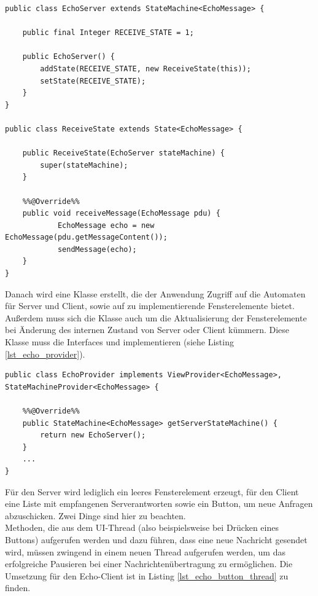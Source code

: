 \begin{lstlisting}[style=java, caption={Implementierung des Serverautomaten}, label=lst_echo_server_state_machine]
public class EchoServer extends StateMachine<EchoMessage> {

	public final Integer RECEIVE_STATE = 1; 
	
	public EchoServer() {
		addState(RECEIVE_STATE, new ReceiveState(this));               
		setState(RECEIVE_STATE);
	}
}

public class ReceiveState extends State<EchoMessage> {

	public ReceiveState(EchoServer stateMachine) {
		super(stateMachine);
	}

	%%@Override%%
	public void receiveMessage(EchoMessage pdu) {
			EchoMessage echo = new EchoMessage(pdu.getMessageContent());
			sendMessage(echo);
	}
}
\end{lstlisting}

Danach wird eine Klasse  erstellt, die der Anwendung Zugriff auf die Automaten für Server und Client, sowie auf zu implementierende Fensterelemente bietet. Außerdem muss sich die Klasse auch um die Aktualisierung der Fensterelemente bei Änderung des internen Zustand von Server oder Client kümmern. Diese Klasse muss die Interfaces  und  implementieren (siehe Listing \ref{lst_echo_provider}).

\begin{lstlisting}[style=java, caption={Implementierung der \sourceobject{EchoProvider}-Klasse}, label=lst_echo_provider]
public class EchoProvider implements ViewProvider<EchoMessage>, StateMachineProvider<EchoMessage> {

	%%@Override%%
	public StateMachine<EchoMessage> getServerStateMachine() {
		return new EchoServer();
	}
	...
}
\end{lstlisting}

Für den Server wird lediglich ein leeres Fensterelement erzeugt, für den Client eine Liste mit empfangenen Serverantworten sowie ein Button, um neue Anfragen abzuschicken. Zwei Dinge sind hier zu beachten.\\
Methoden, die aus dem UI-Thread (also beispielsweise bei Drücken eines Buttons) aufgerufen werden und dazu führen, dass eine neue Nachricht gesendet wird, müssen zwingend in einem neuen Thread aufgerufen werden, um das erfolgreiche Pausieren bei einer Nachrichtenübertragung zu ermöglichen. Die Umsetzung für den Echo-Client ist in Listing \ref{lst_echo_button_thread} zu finden.

